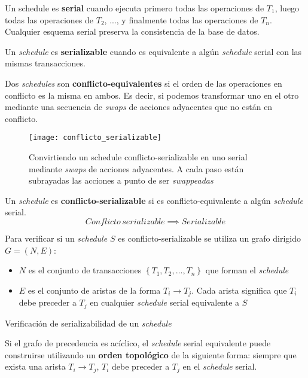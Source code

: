 \documentclass[a4paper, twoside]{article}
\newcommand{\codedir}{../resources/code} %
\begin{document}
Un schedule es \textbf{serial} cuando ejecuta primero todas las operaciones de $T_{1}$, luego todas las operaciones de $T_{2}$, ..., y finalmente todas las operaciones de $T_{n}$. Cualquier esquema serial preserva la consistencia de la base de datos.

Un \emph{schedule} es \textbf{serializable} cuando es equivalente a algún \emph{schedule} serial con las mismas transacciones.

Dos \emph{schedules} son \textbf{conflicto-equivalentes} si el orden de las operaciones en conflicto es la misma en ambos. Es decir, si podemos transformar uno en el otro mediante una secuencia de \emph{swaps} de acciones adyacentes que no están en conflicto.

\begin{figure}[H]
	\centering
	\texttt{[image: conflicto\_serializable]}
	\caption{Convirtiendo un schedule conflicto-serializable en uno serial mediante \emph{swaps} de acciones adyacentes. A cada paso están subrayadas las acciones a punto de ser \emph{swappeadas}}
\end{figure}

Un \emph{schedule} es \textbf{conflicto-serializable} si es conflicto-equivalente a algún \emph{schedule} serial.
\[
	Conflicto\, serializable \implies Serializable
\]

Para verificar si un \emph{schedule $S$ }es conflicto-serializable se utiliza un grafo dirigido $G=(N,E)$:
\begin{itemize}
	\item $N$ es el conjunto de transacciones $\left\{ T_{1},T_{2},\ldots,T_{n}\right\} $ que forman el \emph{schedule}
	\item $E$ es el conjunto de aristas de la forma $T_{i}\to T_{j}$. Cada arista significa que $T_{i}$ debe preceder a $T_{j}$ en cualquier \emph{schedule} serial equivalente a $S$
\end{itemize}

\begin{algorithm}[H]
	
	\caption{Verificación de serializabilidad de un \emph{schedule}}
\end{algorithm}

Si el grafo de precedencia es acíclico, el \emph{schedule} serial equivalente puede construirse utilizando un \textbf{orden topológico} de la siguiente forma: siempre que exista una arista $T_{i}\to T_{j}$, $T_{i}$ debe preceder a $T_{j}$ en el \emph{schedule }serial.
\end{document}
